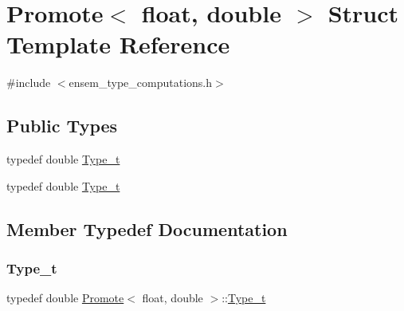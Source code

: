 \hypertarget{structPromote_3_01float_00_01double_01_4}{}\section{Promote$<$ float, double $>$ Struct Template Reference}
\label{structPromote_3_01float_00_01double_01_4}


{\ttfamily \#include $<$ensem\+\_\+type\+\_\+computations.\+h$>$}

\subsection*{Public Types}
\begin{DoxyCompactItemize}
\item 
typedef double \mbox{\hyperlink{structPromote_3_01float_00_01double_01_4_a45975d2ae1225ef4f1993d0a48b8a58e}{Type\+\_\+t}}
\item 
typedef double \mbox{\hyperlink{structPromote_3_01float_00_01double_01_4_a45975d2ae1225ef4f1993d0a48b8a58e}{Type\+\_\+t}}
\end{DoxyCompactItemize}


\subsection{Member Typedef Documentation}
\mbox{\label{structPromote_3_01float_00_01double_01_4_a45975d2ae1225ef4f1993d0a48b8a58e}} 
\subsubsection{\texorpdfstring{Type\_t}{Type\_t}\hspace{0.1cm}{\footnotesize\ttfamily [1/2]}}
{\footnotesize\ttfamily typedef double \mbox{\hyperlink{structPromote}{Promote}}$<$ float, double $>$\+::\mbox{\hyperlink{structPromote_3_01float_00_01double_01_4_a45975d2ae1225ef4f1993d0a48b8a58e}{Type\+\_\+t}}}

\mbox{\label{structPromote_3_01float_00_01double_01_4_a45975d2ae1225ef4f1993d0a48b8a58e}} 
